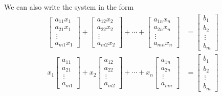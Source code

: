     We can also write the system in the form 
    \begin{align*}
        \begin{bmatrix}
            a_{11}x_1 \\ a_{21}x_{1} \\ \,\vdots \\ a_{m1}x_1
        \end{bmatrix} + \begin{bmatrix}
            a_{12}x_2 \\ a_{22}x_{2} \\ \,\vdots \\ a_{m2}x_2
        \end{bmatrix} + \cdots + \begin{bmatrix}
            a_{1n}x_n \\ a_{2n}x_{n} \\ \,\vdots \\ a_{mn}x_n
        \end{bmatrix} &= \begin{bmatrix}
            b_1 \\ b_2 \\ \,\vdots \\ b_m
        \end{bmatrix} \\
        x_1\begin{bmatrix}
            a_{11} \\ a_{21} \\ \,\vdots \\ a_{m1}
        \end{bmatrix} + x_2\begin{bmatrix}
            a_{12} \\ a_{22} \\ \,\vdots \\ a_{m2}
        \end{bmatrix} + \cdots + x_n\begin{bmatrix}
            a_{1n} \\ a_{2n} \\ \,\vdots \\ a_{mn}
        \end{bmatrix} &= \begin{bmatrix}
            b_1 \\ b_2 \\ \,\vdots \\ b_m
        \end{bmatrix}
    \end{align*}

